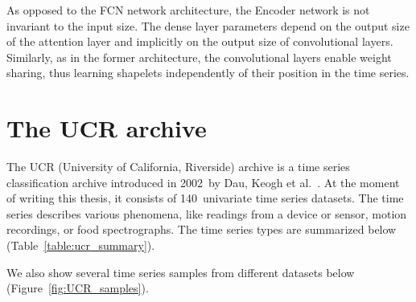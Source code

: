 \documentclass[a4paper,11pt,twoside]{report}
\theoremstyle{definition}
\begin{document}
As opposed to the FCN network architecture, the Encoder network is not invariant to the input size. The dense layer parameters depend on the output size of the attention layer and implicitly on the output size of convolutional layers.  Similarly, as in the former architecture, the convolutional layers enable weight sharing, thus learning shapelets independently of their position in the time series.


\section{The UCR archive}
The UCR (University of California, Riverside) archive is a time series classification archive introduced in 2002~by Dau, Keogh et al.~\cite{UCR_archive, UCR_article}. At the moment of writing this thesis, it consists of 140~univariate time series datasets. The time series describes various phenomena, like readings from a device or sensor, motion recordings, or food spectrographs. The time series types are summarized below (Table~\ref{table:ucr_summary}).
\begin{table}[!h]
\caption{Summary of types of datasets in the UCR archive.}
\centering
\tabcolsep=0.11cm
\label{table:ucr_summary}
\end{table}
\FloatBarrier
 We also show several time series samples from different datasets below (Figure~\ref{fig:UCR_samples}).
\end{document}
